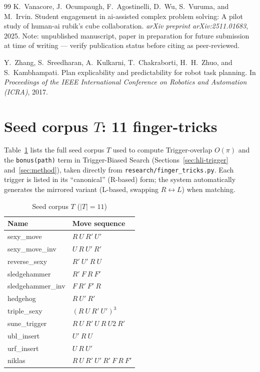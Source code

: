 \documentclass[10pt,conference]{article}
\begin{document}
\begin{thebibliography}{99}
K.~Vanacore, J.~Ocumpaugh, F.~Agostinelli, D.~Wu, S.~Vuruma, and M.~Irvin.
\newblock Student engagement in ai-assisted complex problem solving: A
  pilot study of human-ai rubik's cube collaboration.
\newblock \emph{arXiv preprint arXiv:2511.01683}, 2025.
\newblock Note: unpublished manuscript, paper in preparation for future
  submission at time of writing --- verify publication status before citing
  as peer-reviewed.

Y.~Zhang, S.~Sreedharan, A.~Kulkarni, T.~Chakraborti, H.~H.~Zhuo, and
  S.~Kambhampati.
\newblock Plan explicability and predictability for robot task planning.
\newblock In \emph{Proceedings of the IEEE International Conference on
  Robotics and Automation (ICRA)}, 2017.

\end{thebibliography}

\appendix
\section{Seed corpus $T$: 11 finger-tricks}
\label{app:triggers}
Table~\ref{tab:triggers} lists the full seed corpus $T$ used to compute
Trigger-overlap $O(\pi)$ and the \texttt{bonus(path)} term in
Trigger-Biased Search (Sections~\ref{sec:hli-trigger}
and~\ref{sec:method}), taken directly from
\texttt{research/finger\_tricks.py}. Each trigger is listed in its
``canonical'' (R-based) form; the system automatically generates the
mirrored variant (L-based, swapping $R \leftrightarrow L$) when
matching.

\begin{table}[h]
\centering
\caption{Seed corpus $T$ ($|T|=11$)}
\begin{tabular}{ll}
\toprule
Name & Move sequence \\
\midrule
sexy\_move        & $R\ U\ R'\ U'$ \\
sexy\_move\_inv    & $U\ R\ U'\ R'$ \\
reverse\_sexy      & $R'\ U'\ R\ U$ \\
sledgehammer      & $R'\ F\ R\ F'$ \\
sledgehammer\_inv  & $F\ R'\ F'\ R$ \\
hedgehog          & $R\ U'\ R'$ \\
triple\_sexy       & $(R\ U\ R'\ U')^3$ \\
sune\_trigger      & $R\ U\ R'\ U\ R\ U2\ R'$ \\
ubl\_insert        & $U'\ R\ U$ \\
urf\_insert        & $U\ R\ U'$ \\
niklas            & $R\ U\ R'\ U'\ R'\ F\ R\ F'$ \\
\bottomrule
\end{tabular}
\label{tab:triggers}
\end{table}
\end{document}
